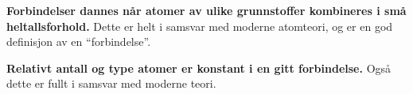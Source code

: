 \vskip 10pt

{\bf Forbindelser dannes når atomer av ulike grunnstoffer kombineres i små heltallsforhold.} Dette er helt i samsvar med moderne atomteori, og er en god definisjon av en ``forbindelse''.

\vskip 10pt

{\bf Relativt antall og type atomer er konstant i en gitt forbindelse.} Også dette er fullt i samsvar med moderne teori.










